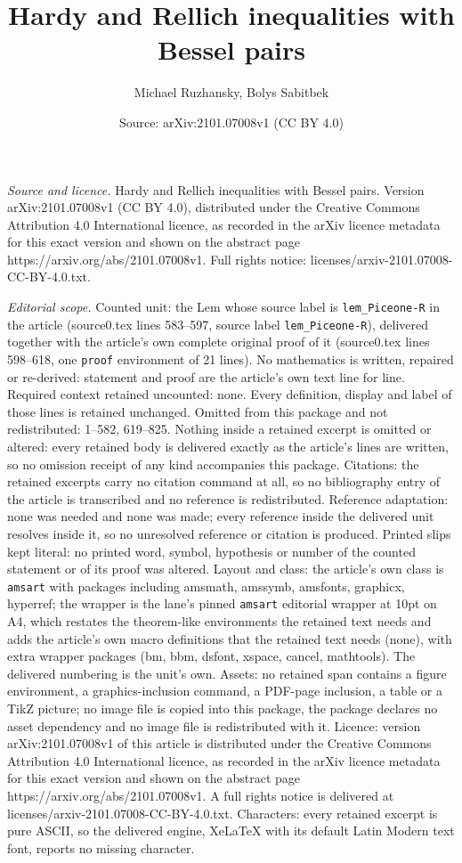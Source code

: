 \documentclass[10pt,a4paper]{amsart}
\title[Hardy and Rellich inequalities with Bessel pairs]{Hardy and Rellich inequalities with Bessel pairs}
\author{Michael Ruzhansky, Bolys Sabitbek}
\date{Source: arXiv:2101.07008v1 (CC BY 4.0)}
\begin{document}
\maketitle

\noindent\emph{Source and licence.} Hardy and Rellich inequalities with Bessel pairs. Version arXiv:2101.07008v1 (CC BY 4.0), distributed under the Creative Commons Attribution 4.0 International licence, as recorded in the arXiv licence metadata for this exact version and shown on the abstract page https://arxiv.org/abs/2101.07008v1. Full rights notice: licenses/arxiv-2101.07008-CC-BY-4.0.txt.\par\smallskip

\noindent\textit{Editorial scope.} Counted unit: the Lem whose source label is \texttt{lem\_Piceone-R} in the article (source0.tex lines 583--597, source label \texttt{lem\_Piceone-R}), delivered together with the article's own complete original proof of it (source0.tex lines 598--618, one \texttt{proof} environment of 21 lines). No mathematics is written, repaired or re-derived: statement and proof are the article's own text line for line. Required context retained uncounted: none. Every definition, display and label of those lines is retained unchanged. Omitted from this package and not redistributed: 1--582, 619--825. Nothing inside a retained excerpt is omitted or altered: every retained body is delivered exactly as the article's lines are written, so no omission receipt of any kind accompanies this package. Citations: the retained excerpts carry no citation command at all, so no bibliography entry of the article is transcribed and no reference is redistributed. Reference adaptation: none was needed and none was made; every reference inside the delivered unit resolves inside it, so no unresolved reference or citation is produced. Printed slips kept literal: no printed word, symbol, hypothesis or number of the counted statement or of its proof was altered. Layout and class: the article's own class is \texttt{amsart} with packages including amsmath, amssymb, amsfonts, graphicx, hyperref; the wrapper is the lane's pinned \texttt{amsart} editorial wrapper at 10pt on A4, which restates the theorem-like environments the retained text needs and adds the article's own macro definitions that the retained text needs (none), with extra wrapper packages (bm, bbm, dsfont, xspace, cancel, mathtools). The delivered numbering is the unit's own. Assets: no retained span contains a figure environment, a graphics-inclusion command, a PDF-page inclusion, a table or a TikZ picture; no image file is copied into this package, the package declares no asset dependency and no image file is redistributed with it. Licence: version arXiv:2101.07008v1 of this article is distributed under the Creative Commons Attribution 4.0 International licence, as recorded in the arXiv licence metadata for this exact version and shown on the abstract page https://arxiv.org/abs/2101.07008v1. A full rights notice is delivered at licenses/arxiv-2101.07008-CC-BY-4.0.txt. Characters: every retained excerpt is pure ASCII, so the delivered engine, XeLaTeX with its default Latin Modern text font, reports no missing character.
\end{document}
